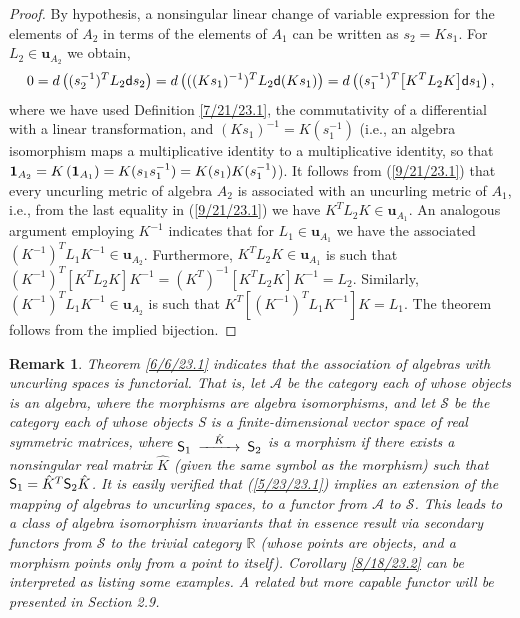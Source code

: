 \documentclass{amsart}
\numberwithin{equation}{section}
\newtheorem{remark}[theorem]{Remark}
\theoremstyle{definition}
\numberwithin{theorem}{section}
\begin{document}
\begin{proof} By hypothesis, a nonsingular linear change of variable expression for the elements of $A_2$ in terms of the elements of $A_1$ can be written as $s_2= Ks_1$. \mbox{For $L_2\in \mathbf{u}_{A_2}$} we obtain, \begin{equation} 0 = d\left((s_2^{-1})^T L_2 {\sf d}s_2\right) =  d\left(((Ks_1)^{-1})^T L_2 {\sf d}(Ks_1)\right) = d\left((s_1^{-1})^T \big[K^T L_2K\big]{\sf d}s_1\right), \label{9/21/23.1}  \end{equation} where we have used Definition \ref{7/21/23.1}, the commutativity of a differential with a linear transformation, and $(Ks_1)^{-1} = K(s_1^{-1})$ (i.e., an algebra isomorphism maps a multiplicative identity to a multiplicative identity, so that ${\bf 1}_{A_2} = K\left(\mathbf{1}_{A_1}\right) = K(s_1s_1^{-1}) = K(s_1)K(s_1^{-1})$).  It follows from (\ref{9/21/23.1}) that every uncurling metric  of algebra $A_2$ is associated with an uncurling metric of $A_1$, i.e., from the last equality in (\ref{9/21/23.1}) we have  $K^TL_2K\in\mathbf{u}_{A_1}$.  An analogous argument employing $K^{-1}$ indicates that for $L_1\in\mathbf{u}_{A_1}$ we have the associated $(K^{-1})^T L_1 K^{-1} \in \mathbf{u}_{A_2}$.    Furthermore, $K^T L_2K\in\mathbf{u}_{A_1}$ is such that $(K^{-1})^T [K^T L_2 K]K^{-1} = (K^T)^{-1} [K^T L_2 K]K^{-1} = L_2$.  Similarly, $(K^{-1})^T L_1K^{-1}\in\mathbf{u}_{A_2}$ is such that $K^T[(K^{-1})^T L_1K^{-1}] K = L_1$.  The theorem follows from the implied bijection. 
\end{proof}

\begin{remark} \label{3/31/24.1} {\rm Theorem \ref{6/6/23.1} indicates that the association of algebras with uncurling spaces is functorial.  That is, let $\mathcal{A}$ be the category each of whose objects is an algebra, where the morphisms are algebra isomorphisms, and let $\mathcal{S}$ be the category each of whose objects {\sf S} is a finite-dimensional vector space of real symmetric matrices, where $\begin{CD}  {\sf S}_1 @>\hat{K}>> {\sf S}_2\end{CD}$ is a morphism if there exists a nonsingular real matrix $\hat{K}$ (given the same symbol as the morphism) such that \mbox{${\sf S}_1  = \hat{K}^T  {\sf S}_2 \hat{K}$.}  It is easily verified that (\ref{5/23/23.1}) implies an extension of the mapping of algebras to uncurling spaces, to a functor from $\mathcal{A}$ to $\mathcal{S}$.  This leads to a class of algebra isomorphism invariants that in essence result via secondary functors from $\mathcal{S}$ to the trivial category $\mathbb{R}$ (whose points are objects, and a morphism points only from a point to itself).  Corollary \ref{8/18/23.2} can be interpreted as listing some examples.  A related but more capable functor will be presented in Section 2.9.}\end{remark}
\end{document}

